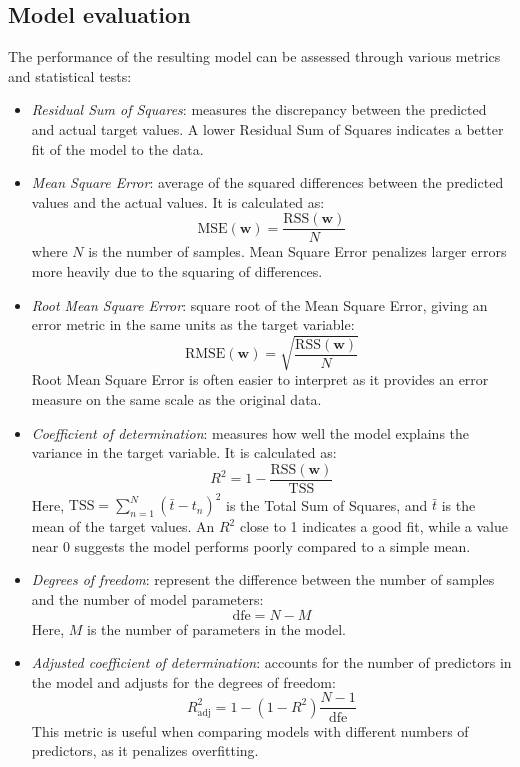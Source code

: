 \subsection{Model evaluation}
The performance of the resulting model can be assessed through various metrics and statistical tests:
\begin{itemize}
    \item \textit{Residual Sum of Squares}: measures the discrepancy between the predicted and actual target values.
        A lower Residual Sum of Squares indicates a better fit of the model to the data.
    \item \textit{Mean Square Error}: average of the squared differences between the predicted values and the actual values. 
        It is calculated as:
        \[\text{MSE}(\mathbf{w})=\dfrac{\text{RSS}(\textbf{w})}{N}\]
        where $N$ is the number of samples. 
        Mean Square Error penalizes larger errors more heavily due to the squaring of differences.
    \item \textit{Root Mean Square Error}: square root of the Mean Square Error, giving an error metric in the same units as the target variable:
        \[\text{RMSE}(\mathbf{w})=\sqrt{\dfrac{\text{RSS}(\textbf{w})}{N}}\]
        Root Mean Square Error is often easier to interpret as it provides an error measure on the same scale as the original data.
    \item \textit{Coefficient of determination}: measures how well the model explains the variance in the target variable. 
        It is calculated as:
        \[R^2=1-\dfrac{\text{RSS}(\mathbf{w})}{\text{TSS}}\]
        Here, $\text{TSS}=\sum_{n=1}^N(\bar{t}-t_n)^2$ is the Total Sum of Squares, and $\bar{t}$ is the mean of the target values.
        An $R^2$ close to 1 indicates a good fit, while a value near 0 suggests the model performs poorly compared to a simple mean.
    \item \textit{Degrees of freedom}: represent the difference between the number of samples and the number of model parameters:
        \[\text{dfe}=N-M\]
        Here, $M$ is the number of parameters in the model.
    \item \textit{Adjusted coefficient of determination}: accounts for the number of predictors in the model and adjusts for the degrees of freedom:
        \[R^2_{\text{adj}}=1-(1-R^2)\dfrac{N-1}{\text{dfe}}\]
        This metric is useful when comparing models with different numbers of predictors, as it penalizes overfitting.
\end{itemize}

